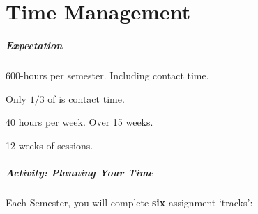 \part{Time Management}
\frame{\partpage}

\begin{frame}
	\frametitle{Expectation}
	
	600-hours per semester. Including contact time.
	
	Only $1/3$ of is contact time.
	
	40 hours per week. Over 15 weeks. 
	
	12 weeks of sessions.

\end{frame}

\begin{frame}
	\frametitle{Activity: Planning Your Time}
	
	Each Semester, you will complete \textbf{six} assignment `tracks':

\end{frame}




